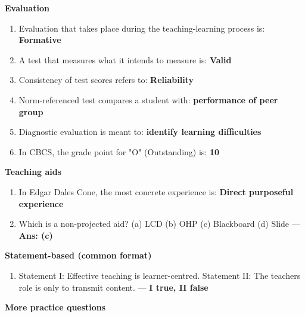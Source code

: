 \textbf{Evaluation}

\begin{enumerate}
\def\labelenumi{\arabic{enumi}.}
\setcounter{enumi}{17}
\tightlist
\item
  Evaluation that takes place during the teaching-learning process is: \textbf{Formative}
\item
  A test that measures what it intends to measure is: \textbf{Valid}
\item
  Consistency of test scores refers to: \textbf{Reliability}
\item
  Norm-referenced test compares a student with: \textbf{performance of peer group}
\item
  Diagnostic evaluation is meant to: \textbf{identify learning difficulties}
\item
  In CBCS, the grade point for "O" (Outstanding) is: \textbf{10}
\end{enumerate}

\textbf{Teaching aids}

\begin{enumerate}
\def\labelenumi{\arabic{enumi}.}
\setcounter{enumi}{23}
\tightlist
\item
  In Edgar Dale\textquotesingle s Cone, the most concrete experience is: \textbf{Direct purposeful experience}
\item
  Which is a non-projected aid? (a) LCD (b) OHP (c) Blackboard (d) Slide --- \textbf{Ans: (c)}
\end{enumerate}

\textbf{Statement-based (common format)}

\begin{enumerate}
\def\labelenumi{\arabic{enumi}.}
\setcounter{enumi}{25}
\tightlist
\item
  Statement I: Effective teaching is learner-centred. Statement II: The teacher\textquotesingle s role is only to transmit content.
  --- \textbf{I true, II false}
\end{enumerate}

\textbf{More practice questions}

